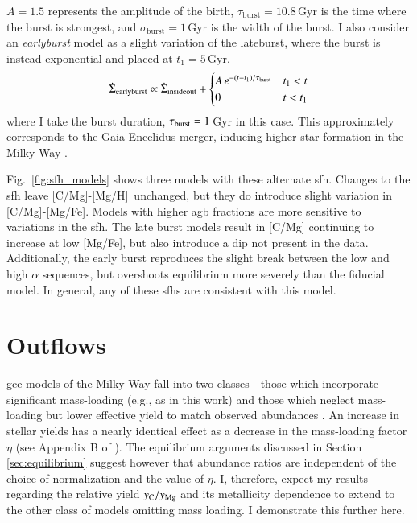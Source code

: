 \documentclass[12pt,oneside,letterpaper]{report}
\newcommand{\agb}{\gls{agb}}
\newcommand{\sfh}{\gls{sfh}}
\newcommand{\Gce}{\Gls{gce}}
\newcommand{\caah}{[C/Mg]-[Mg/H]}
\newcommand{\caafe}{[C/Mg]-[Mg/Fe]}
\begin{document}
$A=1.5$ represents the amplitude of the birth, $\tau_\text{burst}=10.8$\,Gyr is the time where the burst is strongest, and $\sigma_\text{burst}=1$\,Gyr is the width of the burst.
I also consider an \textit{earlyburst} model as a slight variation of the lateburst, where the burst is instead exponential and placed at $t_1=5$\,Gyr. 
\begin{equation}\label{eq:twoinfall}
    \dot{\Sigma}_{\rm earlyburst} \propto \dot{\Sigma}_{\rm insideout} + 
\begin{cases}
    A\,e^{-(t-t_1)/\tau_{\rm burst}} & t_1 < t \\
      0 & t<t_1
\end{cases}
\end{equation}
where I take the burst duration, $\tau_{\rm burst}=1$\,Gyr in this case. 
This approximately corresponds to the Gaia-Encelidus merger, inducing higher star formation in the Milky Way \citep{spitoni21, bonaca20, helmi18}.

Fig.~\ref{fig:sfh_models} shows three models with these alternate \sfh{}. Changes to the \sfh{} leave \caah\ unchanged, but they do introduce slight variation in \caafe. Models with higher \agb{} fractions are more sensitive to variations in the \sfh{}. The late burst models result in [C/Mg] continuing to increase at low [Mg/Fe], but also introduce a dip not present in the data. Additionally, the early burst
reproduces the slight break between the low and high $\alpha$ sequences, but overshoots equilibrium more severely than the fiducial model. 
In general, any of these \sfh{}s are consistent with this model.

\section{Outflows} \label{sec:outflows}

\Gce{} models of the Milky Way fall into two classes---those which incorporate significant mass-loading (e.g., as in this work) and those which neglect mass-loading but lower effective yield to match observed abundances \citep[e.g.][]{MCM13, MCM14, spitoni19, spitoni20, spitoni21}.
An increase in stellar yields has a nearly identical effect as a decrease in the mass-loading factor $\eta$ (see Appendix B of \citealt{james_dwarf}).
The equilibrium arguments discussed in Section \ref{sec:equilibrium} suggest however that abundance ratios are independent of the choice of normalization and the value of $\eta$. I, therefore, expect my results regarding the relative yield $y_{\rm C}/y_{\rm Mg}$ and its metallicity dependence to extend to the other class of models omitting mass loading. I demonstrate this further here.
\end{document}
